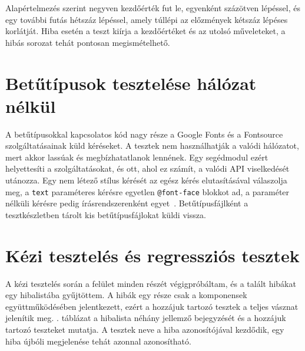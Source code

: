 Alapértelmezés szerint negyven kezdőérték fut le, egyenként százötven lépéssel, és egy további futás hétszáz lépéssel, amely túllépi az előzmények kétszáz lépéses korlátját. Hiba esetén a teszt kiírja a kezdőértéket és az utolsó műveleteket, a hibás sorozat tehát pontosan megismételhető.

\section{Betűtípusok tesztelése hálózat nélkül}
\label{sec:fake_google}

A betűtípusokkal kapcsolatos kód nagy része a Google Fonts és a Fontsource szolgáltatásainak küld kéréseket. A tesztek nem használhatják a valódi hálózatot, mert akkor lassúak és megbízhatatlanok lennének. Egy segédmodul ezért helyettesíti a szolgáltatásokat, és ott, ahol ez számít, a valódi API viselkedését utánozza. Egy nem létező stílus kérését az egész kérés elutasításával válaszolja meg, a \texttt{text} paraméteres kérésre egyetlen \texttt{@font-face} blokkot ad, a paraméter nélküli kérésre pedig írásrendszerenként egyet~\cite{google-fonts-css2}. Betűtípusfájlként a tesztkészletben tárolt kis betűtípusfájlokat küldi vissza.

\section{Kézi tesztelés és regressziós tesztek}
\label{sec:manual_tests}

A kézi tesztelés során a felület minden részét végigpróbáltam, és a talált hibákat egy hibalistába gyűjtöttem. A hibák egy része csak a komponensek együttműködésében jelentkezett, ezért a hozzájuk tartozó tesztek a teljes vásznat jelenítik meg. . táblázat a hibalista néhány jellemző bejegyzését és a hozzájuk tartozó teszteket mutatja. A tesztek neve a hiba azonosítójával kezdődik, egy hiba újbóli megjelenése tehát azonnal azonosítható.

